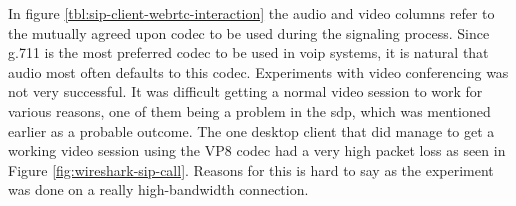 \begin{table}[h]
\caption{WebRTC client interaction with SIP desktop clients using the webrtc2sip gateway.}
\label{tbl:sip-client-webrtc-interaction}
\end{table}

In figure \ref{tbl:sip-client-webrtc-interaction} the audio and video columns refer to the mutually agreed upon codec to be used during the signaling process. Since g.711 is the most preferred codec to be used in \gls{voip} systems, it is natural that audio most often defaults to this codec. Experiments with video conferencing was not very successful. It was difficult getting a normal video session to work for various reasons, one of them being a problem in the \gls{sdp}, which was mentioned earlier as a probable outcome. The one desktop client that did manage to get a working video session using the VP8 codec had a very high packet loss as seen in Figure \ref{fig:wireshark-sip-call}. Reasons for this is hard to say as the experiment was done on a really high-bandwidth connection.


